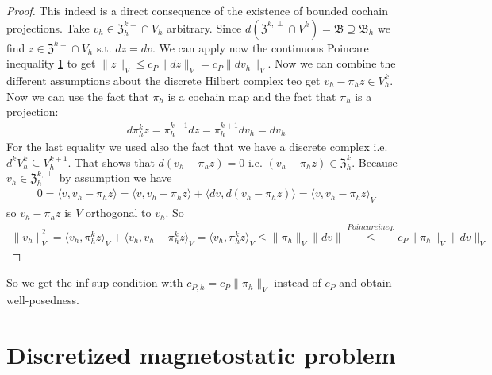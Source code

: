 \documentclass[../master_thesis.tex]{subfiles}
\begin{document}
\begin{proof}
    This indeed is a direct consequence of the existence of bounded cochain projections.
    Take $v_h \in \mathfrak{Z}_h^{k\perp}\cap V_h$ arbitrary. 
    Since $d (\mathfrak{Z}^{k,\perp} \cap V^k) = \mathfrak{B} \supseteq \mathfrak{B}_h$ we find 
    $z\in \mathfrak{Z}^{k\perp}\cap V_h$ s.t. $dz = dv$. We can apply now the continuous 
    Poincare inequality \ref{} to get $\lVert z \rVert _V \leq c_P \lVert dz \rVert _V = c_P \lVert dv_h \rVert _V$.
    Now we can combine the different assumptions about the discrete Hilbert complex teo get 
    $v_h - \pi_h z \in V_h^k$. Now we can use the fact that $\pi_h$ is a cochain map 
    and the fact that $\pi_h$ is a projection:
    \begin{align*}
        d\pi^k_h z = \pi^{k+1}_h dz = \pi^{k+1}_h dv_h = dv_h
    \end{align*}
    For the last equality we used also the fact that we have a discrete complex i.e. $d^k V^k_h \subseteq V^{k+1}_h$.
    That shows that $d(v_h - \pi_h z) = 0$ i.e. $(v_h - \pi_h z) \in \mathfrak{Z}_h^k$.
    Because $v_h \in \mathfrak{Z}_h^{k,\perp}$ by assumption we have 
    \begin{align*}
        0 = \langle v, v_h - \pi_h z \rangle = \langle v, v_h - \pi_h z \rangle + \langle dv, d(v_h - \pi_h z) \rangle
            = \langle v, v_h - \pi_h z \rangle _V
    \end{align*}
    so $v_h - \pi_h z$ is $V$ orthogonal to $v_h$. So 
    \begin{align*}
        \lVert v_h \rVert _V^2 = \langle v_h, \pi_h^k z \rangle _V + \langle v_h, v_h - \pi_h^k z\rangle _V 
        = \langle v_h, \pi_h^k z \rangle _V \leq \lVert \pi_h \rVert _V \lVert dv \rVert
        \stackrel{Poincare ineq.}{\leq} c_P \lVert \pi_h \rVert _V \lVert dv \rVert _V
    \end{align*}
\end{proof}

So we get the inf sup condition with $c_{P,h} = c_P \lVert \pi_h \rVert _V$ instead of $c_P$ 
and obtain well-posedness.

\section{Discretized magnetostatic problem}
\end{document}
